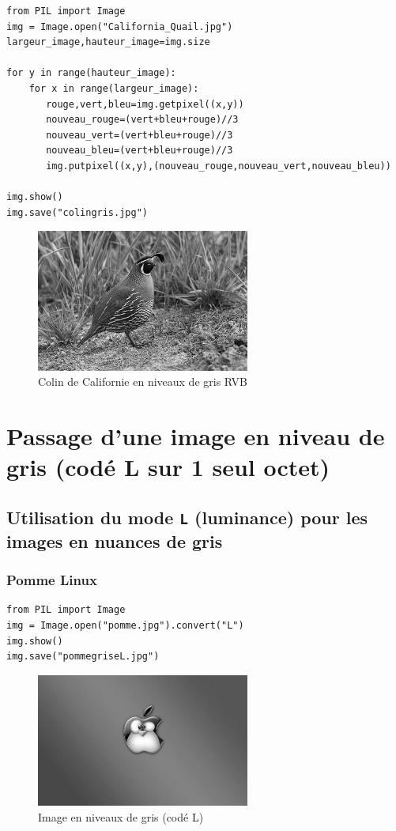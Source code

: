 \documentclass[11pt]{article}
\begin{document}
\begin{verbatim}
from PIL import Image
img = Image.open("California_Quail.jpg")
largeur_image,hauteur_image=img.size

for y in range(hauteur_image):
    for x in range(largeur_image):
       rouge,vert,bleu=img.getpixel((x,y))
       nouveau_rouge=(vert+bleu+rouge)//3
       nouveau_vert=(vert+bleu+rouge)//3
       nouveau_bleu=(vert+bleu+rouge)//3
       img.putpixel((x,y),(nouveau_rouge,nouveau_vert,nouveau_bleu))

img.show()
img.save("colingris.jpg")
\end{verbatim}

\begin{figure}[htbp]
\centering
\includegraphics[width=7cm]{colingris.jpg}
\caption{Colin de Californie en niveaux de gris RVB}
\end{figure}

\section{Passage d'une image en niveau de gris (codé L sur 1 seul octet)}
\label{sec:orgc21acf3}


\subsection{Utilisation du mode \texttt{L} (luminance) pour les images en nuances de gris}
\label{sec:orgacaa3b9}
\subsubsection{Pomme Linux}
\label{sec:orga42ac86}

\begin{verbatim}
from PIL import Image
img = Image.open("pomme.jpg").convert("L")
img.show()
img.save("pommegriseL.jpg")
\end{verbatim}


\begin{figure}[htbp]
\centering
\includegraphics[width=7cm]{pommegriseL.jpg}
\caption{Image en niveaux de gris (codé L)}
\end{figure}
\end{document}

